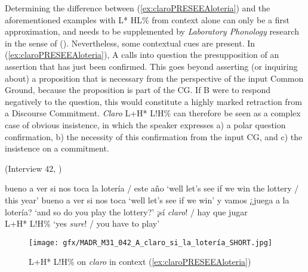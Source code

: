 Determining the difference between (\ref{ex:claroPRESEEAloteria}) and the aforementioned examples with L* HL\% from context alone can only be a first approximation, and needs to be supplemented by \textit{Laboratory Phonology} research in the sense of \citet{CohnFougeronHuffman.2012intro} (). Nevertheless, some contextual cues are present. In (\ref{ex:claroPRESEEAloteria}), A calls into question the presupposition of an assertion that has just been confirmed. This goes beyond asserting (or inquiring about) a proposition that is necessary from the perspective of the input Common Ground, because the proposition is part of the \ac{CG}. If B were to respond negatively to the question, this would constitute a highly marked retraction from a Discourse Commitment. \textit{Claro} L+H* L!H\% can therefore be seen as a complex case of obvious insistence, in which the speaker expresses a) a polar question confirmation, b) the necessity of this confirmation from the input \ac{CG}, and c) the insistence on a commitment.

\begin{exe}
\ex \label{ex:claroPRESEEAloteria} (Interview 42, \cite{PRESEEA.20142020})
    \begin{xlist}[A:]
     bueno a ver si nos toca la lotería / este año 
	\glt `well let's see if we win the lottery / this year'
	 bueno a ver si nos toca 
	\glt `well let's see if we win'
	 y vamos ¿juega a la lotería? 
	\glt `and so do you play the lottery?'
	 ¡sí \textit{claro}! / hay que jugar \\
	\hspace*{.5em}L+H* L!H\% 
	\glt `yes \textit{sure}! / you have to play'
	\end{xlist}
\end{exe}\largerpage

\begin{figure}
	\texttt{[image: gfx/MADR\_M31\_042\_A\_claro\_si\_la\_lotería\_SHORT.jpg]}
	\caption{L+H* L!H\% on \textit{claro} in context (\ref{ex:claroPRESEEAloteria}) \href{https://osf.io/fty73/}{\faVolumeUp} \label{fig:claroPRESEEAloteria}}
\end{figure}


